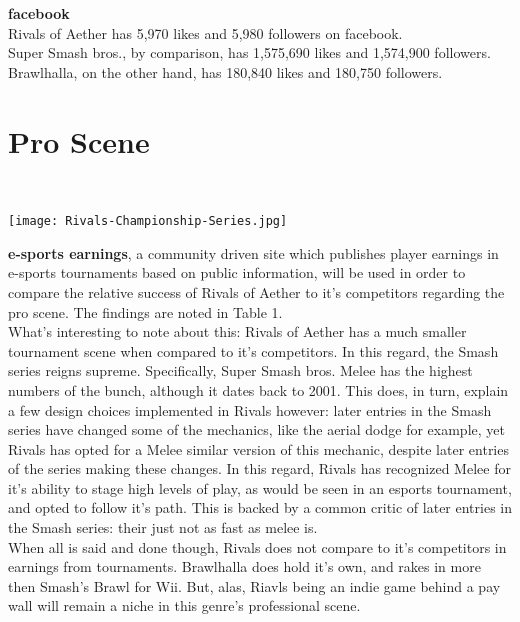 \documentclass{article}
\begin{document}
\textbf{facebook}\\
Rivals of Aether has 5,970 likes and 5,980 followers on facebook. \cite{fb:11}\\
Super Smash bros., by comparison, has 1,575,690 likes and 1,574,900 followers. \cite{fbs:12}\\
Brawlhalla, on the other hand, has 180,840 likes and 180,750 followers.\cite{fbb:13}\\

\chapter{\textbf{Pro Scene}}\\

\begin{center}
\texttt{[image: Rivals-Championship-Series.jpg]}
\end{center}
\textbf{e-sports earnings}, a community driven site which publishes player earnings in e-sports tournaments based on public information, will be used in order to compare the relative success of Rivals of Aether to it's competitors regarding the pro scene. The findings are noted in Table 1.\\
What's interesting to note about this: Rivals of Aether has a much smaller tournament scene when compared to it's competitors. In this regard, the Smash series reigns supreme. Specifically, Super Smash bros. Melee has the highest numbers of the bunch, although it dates back to 2001. This does, in turn, explain a few design choices implemented in Rivals however: later entries in the Smash series have changed some of the mechanics, like the aerial dodge for example, yet Rivals has opted for a Melee similar version of this mechanic, despite later entries of the series making these changes. In this regard, Rivals has recognized Melee for it's ability to stage high levels of play, as would be seen in an esports tournament, and opted to follow it's path. This is backed by a common critic of later entries in the Smash series: their just not as fast as melee is.\\
\newpage
When all is said and done though, Rivals does not compare to it's competitors in earnings from tournaments. Brawlhalla does hold it's own, and rakes in more then Smash's Brawl for Wii. But, alas, Riavls being an indie game behind a pay wall will remain a niche in this genre's professional scene.\\
\end{document}
